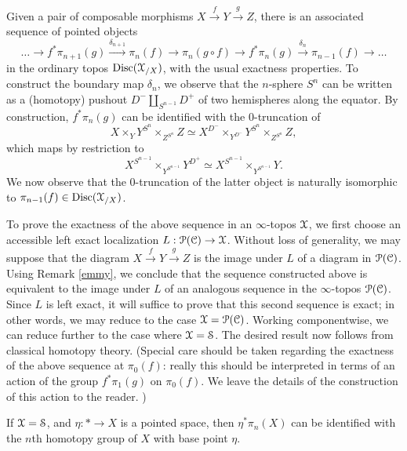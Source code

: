 \begin{remark}\label{sequence}
Given a pair of composable morphisms $X \stackrel{f}{\rightarrow}
Y \stackrel{g}{\rightarrow} Z$, there is an associated sequence of pointed objects
$$\ldots \rightarrow f^{\ast} \pi_{n+1}(g) \stackrel{\delta_{n+1}}{\rightarrow} \pi_n(f) \rightarrow \pi_n(g \circ f) \rightarrow f^{\ast}
\pi_n(g) \stackrel{\delta_{n}}{\rightarrow} \pi_{n-1}(f) \rightarrow \ldots$$
in the ordinary topos $\operatorname{Disc}(\operatorname{\mathcal{X}}_{/X})$, with the
usual exactness properties. To construct the boundary map $\delta_n$, we observe
that the $n$-sphere $S^n$ can be written as a (homotopy) pushout
$D^{-} \amalg_{ S^{n-1} } D^{+}$ of two hemispheres along the equator. By construction,
$f^{\ast} \pi_n(g)$ can be identified with the $0$-truncation of
$$X \times_{Y} Y^{S^n} \times_{ Z^{S^n} } Z \simeq
X^{D^{-}} \times_{ Y^{D^{-}} } Y^{S^n} \times_{ Z^{S^{n}} } Z,$$
which maps by restriction to
$$ X^{S^{n-1}} \times_{ Y^{S^{n-1}} } Y^{D^{+}} \simeq X^{ S^{n-1} } \times_{Y^{S^{n-1}} } Y.$$
We now observe that the $0$-truncation of the latter object is naturally isomorphic to
$\pi_{n-1}(f) \in \operatorname{Disc}(\operatorname{\mathcal{X}}_{/X})$.

To prove the exactness of the above sequence in an $\infty$-topos $\operatorname{\mathcal{X}}$, we
first choose an accessible left exact localization $L: \operatorname{\mathcal{P}}(\operatorname{\mathcal{C}}) \rightarrow \operatorname{\mathcal{X}}$.
Without loss of generality, we may suppose that the diagram
$X \stackrel{f}{\rightarrow} Y \stackrel{g}{\rightarrow} Z$ is the image under $L$ of
a diagram in $\operatorname{\mathcal{P}}(\operatorname{\mathcal{C}})$. Using Remark \ref{emmy}, we conclude that the sequence constructed above is equivalent to the image under $L$ of an analogous sequence in the $\infty$-topos
$\operatorname{\mathcal{P}}(\operatorname{\mathcal{C}})$. Since $L$ is left exact, it will suffice to prove that this second sequence is exact; in other words, we may reduce to the case $\operatorname{\mathcal{X}} = \operatorname{\mathcal{P}}(\operatorname{\mathcal{C}})$. Working componentwise, we
can reduce further to the case where $\operatorname{\mathcal{X}} = \operatorname{\mathcal{S}}$. The desired result now follows from classical homotopy theory. (Special care should be taken regarding the exactness of the above sequence
at $\pi_0(f)$: really this should be interpreted in terms of an action of the group $f^{\ast} \pi_1(g)$ on
$\pi_0(f)$. We leave the details of the construction of this action to the reader. )
\end{remark}

\begin{remark}
If $\operatorname{\mathcal{X}} = \operatorname{\mathcal{S}}$, and $\eta: \ast \rightarrow X$ is a pointed
space, then $\eta^{\ast} \pi_{n}(X)$ can be identified with the $n$th homotopy group
of $X$ with base point $\eta$.
\end{remark}

